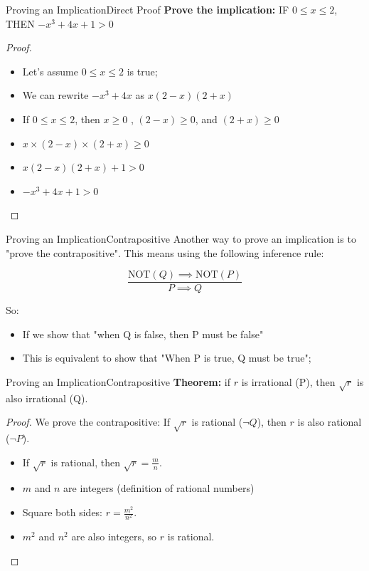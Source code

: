 \begin{frame}{Proving an Implication}{Direct Proof}
{\bf Prove the implication:} IF $0 \leq x \leq 2$, THEN $-x^3 + 4x + 1 > 0$\bigskip

\begin{proof}
\begin{itemize}
  \item Let's assume $0 \leq x \leq 2$ is true;
  \item We can rewrite $-x^3 + 4x$ as $x(2-x)(2+x)$
  \item If $0 \leq x \leq 2$, then $x \ge 0$ , $(2-x) \ge 0$, and $(2+x) \ge 0$
  \item $x \times (2-x) \times (2+x) \geq 0$
  \item $x(2-x)(2+x) + 1 > 0$
  \item $-x^3 + 4x + 1 > 0$
\end{itemize}
\end{proof}

\end{frame}

\begin{frame}[t]{Proving an Implication}{Contrapositive}
  Another way to prove an implication is to "prove the contrapositive". This means using the following inference rule:

  \[
    \frac{\text{NOT}(Q) \implies \text{NOT}(P)}{P \implies Q}
  \]\bigskip

  So:
  \begin{itemize}
    \item If we show that "when Q is false, then P must be false"
    \item This is equivalent to show that "When P is true, Q must be true";
  \end{itemize}
\end{frame}

\begin{frame}{Proving an Implication}{Contrapositive}
  {\bf Theorem:} if $r$ is irrational (P), then $\sqrt{r}$ is also irrational (Q).

  \begin{proof}
    We prove the contrapositive: If $\sqrt{r}$ is rational ($\lnot Q$), then $r$ is also rational ($\lnot P$).
    \begin{itemize}
      \item If $\sqrt{r}$ is rational, then $\sqrt{r}=\frac{m}{n}$.
      \item $m$ and $n$ are integers (definition of rational numbers)
      \item Square both sides: $r = \frac{m^2}{n^2}$.
      \item $m^2$ and $n^2$ are also integers, so $r$ is rational.
    \end{itemize}
  \end{proof}
\end{frame}



